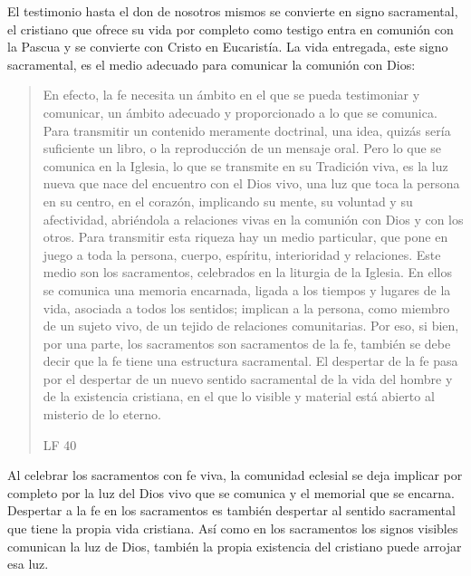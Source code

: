 El testimonio hasta el don de nosotros mismos se convierte en signo sacramental,
el cristiano que ofrece su vida por completo como testigo entra en comunión con
la Pascua y se convierte con Cristo en Eucaristía. La vida entregada, este signo
sacramental, es el medio adecuado para comunicar la comunión con Dios:
\blockquote[LF 40]{En efecto, la fe necesita un ámbito en el que se pueda
  testimoniar y comunicar, un ámbito adecuado y proporcionado a lo que se
  comunica. Para transmitir un contenido meramente doctrinal, una idea, quizás
  sería suficiente un libro, o la reproducción de un mensaje oral. Pero lo que
  se comunica en la Iglesia, lo que se transmite en su Tradición viva, es la luz
  nueva que nace del encuentro con el Dios vivo, una luz que toca la persona en
  su centro, en el corazón, implicando su mente, su voluntad y su afectividad,
  abriéndola a relaciones vivas en la comunión con Dios y con los otros. Para
  transmitir esta riqueza hay un medio particular, que pone en juego a toda la
  persona, cuerpo, espíritu, interioridad y relaciones. Este medio son los
  sacramentos, celebrados en la liturgia de la Iglesia. En ellos se comunica una
  memoria encarnada, ligada a los tiempos y lugares de la vida, asociada a todos
  los sentidos; implican a la persona, como miembro de un sujeto vivo, de un
  tejido de relaciones comunitarias. Por eso, si bien, por una parte, los
  sacramentos son sacramentos de la fe, también se debe decir que la fe tiene
  una estructura sacramental. El despertar de la fe pasa por el despertar de un
  nuevo sentido sacramental de la vida del hombre y de la existencia cristiana,
  en el que lo visible y material está abierto al misterio de lo eterno.}.
Al celebrar los sacramentos con fe viva, la comunidad eclesial se deja implicar
por completo por la luz del Dios vivo que se comunica y el memorial que se
encarna. Despertar a la fe en los sacramentos es también despertar al sentido
sacramental que tiene la propia vida cristiana. Así como en los sacramentos los
signos visibles comunican la luz de Dios, también la propia existencia del
cristiano puede arrojar esa luz.

